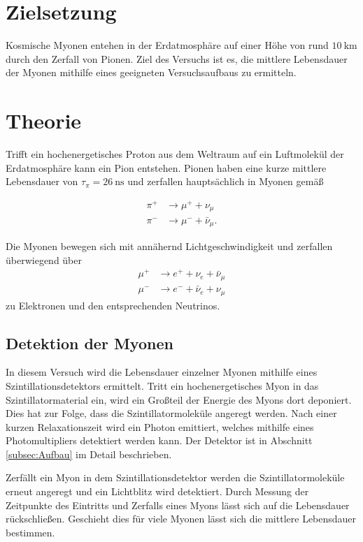 \section{Zielsetzung}
\label{sec:Zielsetzung}
Kosmische Myonen entehen in der Erdatmosphäre auf einer Höhe von rund $\qty{10}{\kilo\metre}$ durch den Zerfall von Pionen. Ziel des Versuchs ist es, die 
mittlere Lebensdauer der Myonen mithilfe eines geeigneten Versuchsaufbaus zu ermitteln.


\section{Theorie}
\label{sec:Theorie}
Trifft ein hochenergetisches Proton aus dem Weltraum auf ein Luftmolekül der Erdatmosphäre kann ein Pion entstehen. Pionen haben eine kurze mittlere 
Lebensdauer von $\tau_\pi = \qty{26}{\nano\second}$ \cite{PDG:muon} und zerfallen hauptsächlich in Myonen gemäß

\begin{align*}
    \pi^+ &\to \mu^+ + \nu_\mu \\
    \pi^- &\to \mu^- + \bar{\nu}_\mu.
\end{align*}

Die Myonen bewegen sich mit annähernd Lichtgeschwindigkeit und zerfallen überwiegend über 
\begin{align*}
    \mu^+ &\to e^+ + \nu_e + \bar{\nu}_\mu \\
    \mu^- &\to e^- + \bar{\nu}_e + \nu_\mu
\end{align*}
zu Elektronen und den entsprechenden Neutrinos.

\subsection{Detektion der Myonen}
\label{subsec:Detektion der Myonen}
In diesem Versuch wird die Lebensdauer einzelner Myonen mithilfe eines Szintillationsdetektors ermittelt. Tritt ein hochenergetisches Myon in das Szintillatormaterial
ein, wird ein Großteil der Energie des Myons dort deponiert. Dies hat zur Folge, dass die Szintillatormoleküle angeregt werden. Nach einer kurzen Relaxationszeit
wird ein Photon emittiert, welches mithilfe eines Photomultipliers detektiert werden kann. Der Detektor ist in Abschnitt \ref{subsec:Aufbau} im Detail beschrieben.

Zerfällt ein Myon in dem Szintillationsdetektor werden die Szintillatormoleküle erneut angeregt und ein Lichtblitz wird detektiert. Durch Messung der Zeitpunkte des Eintritts
und Zerfalls eines Myons lässt sich auf die Lebensdauer rückschließen. Geschieht dies für viele Myonen lässt sich die mittlere Lebensdauer bestimmen.

